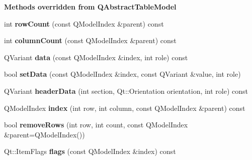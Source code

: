 \begin{Indent}\textbf{ Methods overridden from Q\+Abstract\+Table\+Model}\par
\begin{DoxyCompactItemize}
\item 
\mbox{\label{class_recent_requests_table_model_a339effe43b403b984b8453f774482790}} 
int {\bfseries row\+Count} (const Q\+Model\+Index \&parent) const
\item 
\mbox{\label{class_recent_requests_table_model_a6c18b9f18bf931c31d28dfd7d42b394a}} 
int {\bfseries column\+Count} (const Q\+Model\+Index \&parent) const
\item 
\mbox{\label{class_recent_requests_table_model_ad42929c480fc50cad83114ca5f2cc382}} 
Q\+Variant {\bfseries data} (const Q\+Model\+Index \&index, int role) const
\item 
\mbox{\label{class_recent_requests_table_model_a57aa7dfaeead22d00b9dd3d704fb20e2}} 
bool {\bfseries set\+Data} (const Q\+Model\+Index \&index, const Q\+Variant \&value, int role)
\item 
\mbox{\label{class_recent_requests_table_model_a526f89b7a3b29d47152d456671d12ddb}} 
Q\+Variant {\bfseries header\+Data} (int section, Qt\+::\+Orientation orientation, int role) const
\item 
\mbox{\label{class_recent_requests_table_model_a744b879be9546793860528f6c5350289}} 
Q\+Model\+Index {\bfseries index} (int row, int column, const Q\+Model\+Index \&parent) const
\item 
\mbox{\label{class_recent_requests_table_model_a63504be44ff9d33d5c508f6303622e5a}} 
bool {\bfseries remove\+Rows} (int row, int count, const Q\+Model\+Index \&parent=Q\+Model\+Index())
\item 
\mbox{\label{class_recent_requests_table_model_a67967379939cd8f9dd8c97d6ee18b28f}} 
Qt\+::\+Item\+Flags {\bfseries flags} (const Q\+Model\+Index \&index) const
\end{DoxyCompactItemize}
\end{Indent}


